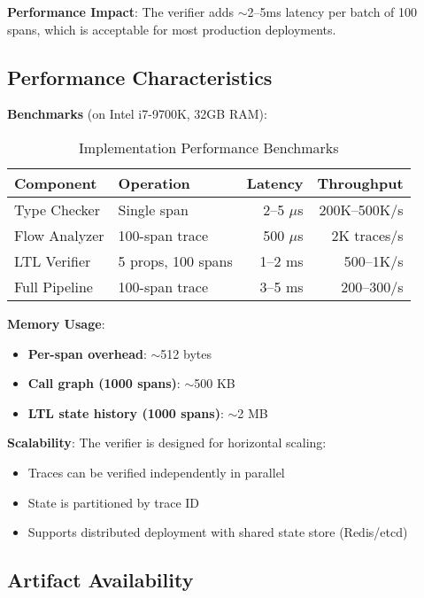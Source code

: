 \textbf{Performance Impact}: The verifier adds $\sim$2--5ms latency per batch of 100 spans, which is acceptable for most production deployments.

\subsection{Performance Characteristics}
\label{sec:impl-performance}

\textbf{Benchmarks} (on Intel i7-9700K, 32GB RAM):

\begin{table}[h]
\caption{Implementation Performance Benchmarks}
\label{tab:impl-performance}
\small
\centering
\begin{tabular}{llrr}
\toprule
\textbf{Component} & \textbf{Operation} & \textbf{Latency} & \textbf{Throughput} \\
\midrule
Type Checker & Single span & 2--5 $\mu$s & 200K--500K/s \\
Flow Analyzer & 100-span trace & 500 $\mu$s & 2K traces/s \\
LTL Verifier & 5 props, 100 spans & 1--2 ms & 500--1K/s \\
Full Pipeline & 100-span trace & 3--5 ms & 200--300/s \\
\bottomrule
\end{tabular}
\vspace{-0.1in}
\end{table}

\textbf{Memory Usage}:
\begin{itemize}
\item \textbf{Per-span overhead}: $\sim$512 bytes
\item \textbf{Call graph (1000 spans)}: $\sim$500 KB
\item \textbf{LTL state history (1000 spans)}: $\sim$2 MB
\end{itemize}

\textbf{Scalability}: The verifier is designed for horizontal scaling:
\begin{itemize}
\item Traces can be verified independently in parallel
\item State is partitioned by trace ID
\item Supports distributed deployment with shared state store (Redis/etcd)
\end{itemize}

\subsection{Artifact Availability}
\label{sec:impl-artifacts}

